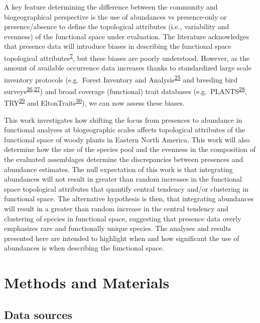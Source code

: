 \documentclass[
  10pt,
]{article}
\begin{document}
A key feature determining the difference between the community and biogeographical perspective is the use of abundances vs presence-only or presence/absence to define the topological attributes (i.e., variability and evenness) of the functional space under evaluation. The literature acknowledges that presence data will introduce biases in describing the functional space topological attributes\textsuperscript{\protect\hyperlink{ref-Swenson2016}{7}}, but these biases are poorly understood. However, as the amount of available occurrence data increases thanks to standardized large scale inventory protocols (e.g.~Forest Inventory and Analysis\textsuperscript{\protect\hyperlink{ref-FIADB}{25}} and breeding bird surveys\textsuperscript{\protect\hyperlink{ref-sauer2008north}{26},\protect\hyperlink{ref-Gillings2019}{27}}) and broad coverage (functional) trait databases (e.g.~PLANTS\textsuperscript{\protect\hyperlink{ref-PLANTS}{28}}, TRY\textsuperscript{\protect\hyperlink{ref-Fraser2020}{29}} and EltonTraits\textsuperscript{\protect\hyperlink{ref-Wilman2014}{30}}), we can now assess these biases.

This work investigates how shifting the focus from presences to abundance in functional analyses at biogeographic scales affects topological attributes of the functional space of woody plants in Eastern North America. This work will also determine how the size of the species pool and the evenness in the composition of the evaluated assemblages determine the discrepancies between presences and abundance estimates. The null expectation of this work is that integrating abundances will not result in greater than random increases in the functional space topological attributes that quantify central tendency and/or clustering in functional space. The alternative hypothesis is then, that integrating abundances will result in a greater than random increase in the central tendency and clustering of species in functional space, suggesting that presence data overly emphasizes rare and functionally unique species. The analyses and results presented here are intended to highlight when and how significant the use of abundances is when describing the functional space.

\hypertarget{methods-and-materials}{%
\section{Methods and Materials}\label{methods-and-materials}}

\hypertarget{data-sources}{%
\subsection{Data sources}\label{data-sources}}
\end{document}
